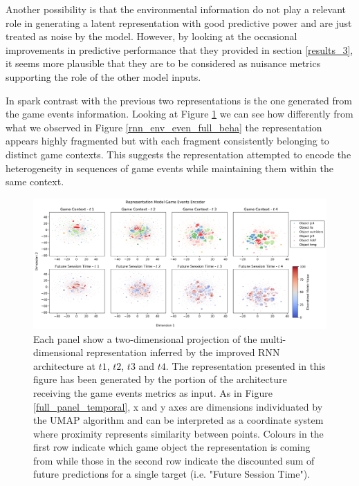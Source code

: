 Another possibility is that the environmental information do not play a relevant role in generating a latent representation with good predictive power and are just treated as noise by the model. However, by looking at the occasional improvements in predictive performance that they provided in section \ref{results_3}, it seems more plausible that they are to be considered as nuisance metrics supporting the role of the other model inputs. 

In spark contrast with the previous two representations is the one generated from the game events information. Looking at Figure \ref{rnn_env_even_full_events} we can see how differently from what we observed in Figure \ref{rnn_env_even_full_beha} the representation appears highly fragmented but with each fragment consistently belonging to distinct game contexts. This suggests the representation attempted to encode the heterogeneity in sequences of game events while maintaining them within the same context.

\begin{figure}[ht]
\centering
\includegraphics[width=\textwidth]{images/chapter_4/RNN_env_even_0_lstm_layer_events_Future Session Time.png}
\caption[\textbf{Lower dimensional representation of the latent representations generated by the improved version of the RNN architecture from the game events metrics}]{Each panel show a two-dimensional projection of the multi-dimensional representation inferred by the improved RNN architecture at $t1$, $t2$, $t3$ and $t4$. The representation presented in this figure has been generated by the portion of the architecture receiving the game events metrics as input. As in Figure \ref{full_panel_temporal}, x and y axes are dimensions individuated by the UMAP algorithm and can be interpreted as a coordinate system where proximity represents similarity between points. Colours in the first row indicate which game object the representation is coming from while those in the second row indicate the discounted sum of future predictions for a single target (i.e. "Future Session Time").}
\label{rnn_env_even_full_events}
\end{figure}


